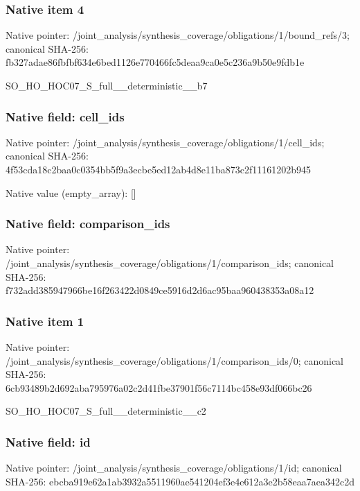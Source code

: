 \documentclass[10pt,a4paper]{article}
\begin{document}
\subsubsection{Native item 4}
Native pointer: /joint\_\allowbreak{}analysis/synthesis\_\allowbreak{}coverage/obligations/1/bound\_\allowbreak{}refs/3; canonical SHA-256: fb327adae86fbfbf634e6bed1126e770466fc5deaa9ca0e5c236a9b50e9fdb1e

\begingroup\raggedright\sloppy SO\_\allowbreak{}HO\_\allowbreak{}HOC07\_\allowbreak{}S\_\allowbreak{}full\_\allowbreak{}\_\allowbreak{}deterministic\_\allowbreak{}\_\allowbreak{}b7\par\endgroup

\subsubsection{Native field: cell\_\allowbreak{}ids}
Native pointer: /joint\_\allowbreak{}analysis/synthesis\_\allowbreak{}coverage/obligations/1/cell\_\allowbreak{}ids; canonical SHA-256: 4f53cda18c2baa0c0354bb5f9a3ecbe5ed12ab4d8e11ba873c2f11161202b945

Native value (empty\_\allowbreak{}array): []

\subsubsection{Native field: comparison\_\allowbreak{}ids}
Native pointer: /joint\_\allowbreak{}analysis/synthesis\_\allowbreak{}coverage/obligations/1/comparison\_\allowbreak{}ids; canonical SHA-256: f732add385947966be16f263422d0849ce5916d2d6ac95baa960438353a08a12

\subsubsection{Native item 1}
Native pointer: /joint\_\allowbreak{}analysis/synthesis\_\allowbreak{}coverage/obligations/1/comparison\_\allowbreak{}ids/0; canonical SHA-256: 6cb93489b2d692aba795976a02c2d41fbe37901f56c7114bc458e93df066bc26

\begingroup\raggedright\sloppy SO\_\allowbreak{}HO\_\allowbreak{}HOC07\_\allowbreak{}S\_\allowbreak{}full\_\allowbreak{}\_\allowbreak{}deterministic\_\allowbreak{}\_\allowbreak{}c2\par\endgroup

\subsubsection{Native field: id}
Native pointer: /joint\_\allowbreak{}analysis/synthesis\_\allowbreak{}coverage/obligations/1/id; canonical SHA-256: ebcba919e62a1ab3932a5511960ae541204ef3e4e612a3e2b58eaa7aea342c2d
\end{document}
